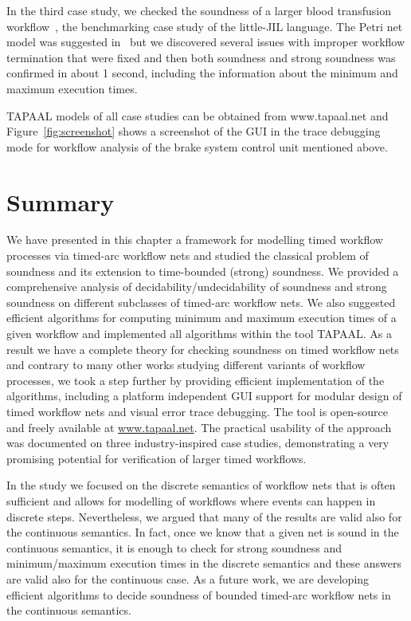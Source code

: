 In the third case study, we checked the soundness 
of a larger blood transfusion workflow~\cite{blood-benchmark},
the benchmarking case study of the little-JIL language. 
The Petri net model was suggested in~\cite{BLS:FHIES:12} but we discovered 
several issues with improper workflow termination that were fixed
and then both soundness and strong soundness was confirmed
in about 1 second, including the information about the minimum 
and maximum execution times. 

TAPAAL models of all case studies can be obtained from www.tapaal.net
and Figure~\ref{fig:screenshot} shows a screenshot of the GUI in the
trace debugging mode for workflow analysis of the brake system control 
unit mentioned above.

\section{Summary}\label{sumWorkflow}

We have presented in this chapter a framework for modelling timed workflow processes
via timed-arc workflow nets and studied the classical problem of
soundness and its extension to time-bounded (strong) soundness.
We provided a comprehensive analysis of decidability/undecidability
of soundness and strong soundness on different subclasses of timed-arc
workflow nets. We also suggested efficient algorithms for computing
minimum and maximum execution times of a given workflow and implemented
all algorithms within the tool TAPAAL. 
As a result we have a complete theory for checking soundness on
timed workflow nets and contrary to many other works studying
different variants of workflow processes, we took a step further
by providing efficient implementation of the algorithms, including
a platform independent GUI support for modular design of timed
workflow nets and visual error trace debugging. The tool is open-source
and freely available at \url{www.tapaal.net}.
The practical usability of 
the approach was documented on three industry-inspired case studies,
demonstrating a very promising potential for verification of larger
timed workflows.

In the study we focused on the discrete semantics 
of workflow nets that is often sufficient and allows for modelling
of workflows where events can happen in discrete steps.
Nevertheless, we argued that many of the results
are valid also for the continuous semantics. In fact, once we
know that a given net is sound in the continuous semantics,
it is enough to check for strong soundness and minimum/maximum
execution times in the discrete semantics and these answers
are valid also for the continuous case. As a future work, we 
are developing efficient algorithms to decide soundness 
of bounded timed-arc workflow nets in the continuous semantics.